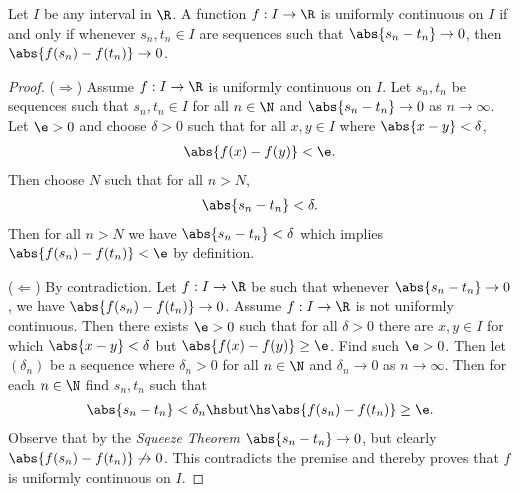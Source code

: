 \documentclass{article}
\begin{document}
\begin{claim*}
   Let $I$ be any interval in $\R$. A function $f:I\to\R$ is uniformly continuous
   on $I$ if and only if whenever $s_n,t_n\in I$ are sequences such that 
   $\abs{s_n-t_n}\to 0$, then $\abs{f(s_n)-f(t_n)}\to 0$.
\end{claim*}
\begin{proof}
   ($\Rightarrow$) Assume $f:I\to\R$ is uniformly continuous on $I$. Let $s_n,t_n$
   be sequences such that $s_n,t_n\in I$ for all $n\in\N$ and $\abs{s_n-t_n}\to 0$
   as $n\to\infty$. Let $\e>0$ and choose $\delta > 0$
   such that for all $x,y\in I$ where $\abs{x-y}<\delta$,
   \begin{align*}
      \abs{f(x)-f(y)}<\e. 
   \end{align*}
   Then choose $N$ such that for all $n>N$,
   \begin{align*}
      \abs{s_n-t_n} < \delta.
   \end{align*}
   Then for all $n>N$ we have $\abs{s_n-t_n}<\delta$ which implies $\abs{f(s_n)-f(t_n)}<\e$ 
   by definition.

   ($\Leftarrow$) By contradiction. 
   Let $f:I\to\R$ be such that whenever $\abs{s_n-t_n}\to 0$, we have 
   $\abs{f(s_n)-f(t_n)}\to 0$.  Assume $f:I\to\R$ is not uniformly continuous.
   Then there exists $\e > 0$ such that for all $\delta>0$ there are $x,y\in I$ for 
   which $\abs{x-y}<\delta$ but $\abs{f(x)-f(y)}\geq \e$. Find such $\e>0$. Then let 
   $(\delta_n)$ be a sequence where $\delta_n>0$ for all $n\in\N$ and $\delta_n\to 0$ as $n\to\infty$. 
   Then for each $n\in\N$ find $s_n,t_n$ such that
   \begin{align*}
      \abs{s_n-t_n} < \delta_n \hs\text{but}\hs \abs{f(s_n)-f(t_n)} \geq \e.
   \end{align*}
   Observe that by the \emph{Squeeze Theorem} $\abs{s_n-t_n}\to 0$, but clearly 
   $\abs{f(s_n)-f(t_n)}\not\to 0$. This contradicts the premise and thereby proves that $f$
   is uniformly continuous on $I$.
\end{proof}
\end{document}
